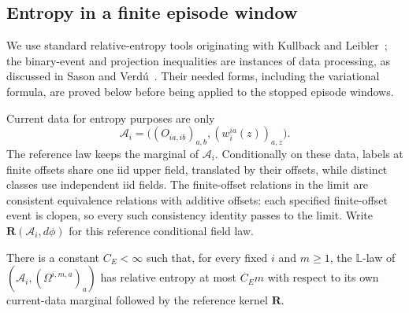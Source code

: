 \subsection{Entropy in a finite episode window}

We use standard relative-entropy tools originating with Kullback and
Leibler~\cite{KullbackLeibler1951}; the binary-event and projection
inequalities are instances of data processing, as discussed in
Sason and Verd\'u~\cite[Section~II-B]{SasonVerdu2016}. Their needed forms,
including the variational formula, are proved below before being applied
to the stopped episode windows.

Current data for entropy purposes are only
\[
\mathcal A_i=\big((O_{ia,ib})_{a,b},(w_i^{ia}(z))_{a,z}\big).
\]
The reference law keeps the marginal of \(\mathcal A_i\).
Conditionally on these data, labels at finite offsets share one iid
upper field, translated by their offsets, while distinct classes use
independent iid fields. The finite-offset relations in the limit are
consistent equivalence relations with additive offsets: each specified
finite-offset event is clopen, so every such consistency identity passes
to the limit. Write \(\mathbf R(\mathcal A_i,d\phi)\) for this reference
conditional field law.

\begin{lemma}\label{profile-entropy}
There is a constant \(C_E<\infty\) such that, for every fixed \(i\) and
\(m\ge1\), the \(\mathbb L\)-law of
\((\mathcal A_i,(\Omega^{i,m,a})_a)\) has relative entropy at most
\(C_E m\) with respect to its own current-data marginal followed by
the reference kernel \(\mathbf R\).
\end{lemma}

